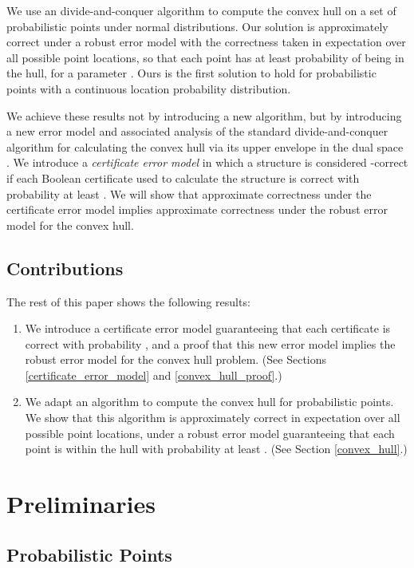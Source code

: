 \documentclass[11pt]{article}
\begin{document}
We use an  divide-and-conquer algorithm to compute the convex
hull on a set of probabilistic points under normal distributions.
Our solution is approximately correct under a robust error model with
the correctness taken in expectation  over all possible point locations, 
so that each point has at least  probability of being in the hull, 
for a parameter . 
Ours is the first solution to hold for
probabilistic points with a continuous location probability
distribution.

We achieve these results not by introducing a new algorithm,
but by introducing a new error model and associated analysis of the
standard divide-and-conquer algorithm for calculating the convex hull
via its upper envelope in the dual space \cite{ORourke1998book}.  
We introduce a \emph{certificate error model} in which a
structure is considered -correct if each Boolean certificate
used to calculate the structure is correct with probability at least
.  We will show that approximate correctness under the
certificate error model implies approximate correctness under the
robust error model for the convex hull.

\subsection{Contributions}

The rest of this paper shows the following results:
\begin{enumerate}
\item We introduce a certificate error model guaranteeing that each certificate is correct with probability , and a proof that this new error model implies the robust error model for the convex hull problem.  (See Sections \ref{certificate_error_model} and \ref{convex_hull_proof}.)
\item We adapt an  algorithm to compute the convex hull for probabilistic points.  We show that this algorithm is approximately correct in expectation over all possible point locations, under a robust error model guaranteeing that each point is within the hull with probability at least .  (See Section \ref{convex_hull}.)
\end{enumerate}


\section{Preliminaries}
\subsection{Probabilistic Points}
\label{sec:prob_points}
\end{document}
